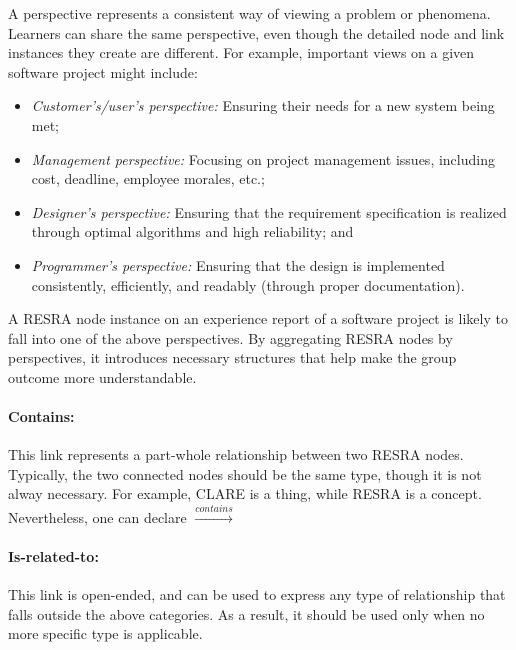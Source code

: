 A perspective represents a consistent way of viewing a problem or
phenomena. Learners can share the same perspective, even though the
detailed node and link instances they create are different. For example,
important views on a given software project might include:

\begin{itemize}
\item {\it Customer's/user's perspective:\/} Ensuring their needs for a new
  system being met;
  
\item {\it Management perspective:\/} Focusing on project management
  issues, including cost, deadline, employee morales, etc.;
  
\item {\it Designer's perspective:\/} Ensuring that the requirement
  specification is realized through optimal algorithms and high reliability;
  and
  
\item {\it Programmer's perspective:\/} Ensuring that the design is
  implemented consistently, efficiently, and readably (through proper
  documentation).
\end{itemize}

A RESRA node instance on an experience report of a software project is
likely to fall into one of the above perspectives. By aggregating RESRA
nodes by perspectives, it introduces necessary structures that help make
the group outcome more understandable.


\paragraph{Contains:}

This link represents a part-whole relationship between two RESRA nodes.
Typically, the two connected nodes should be the same type, though it is
not alway necessary. For example, CLARE is a {\sf thing\/}, while {\sf
RESRA\/} is a {\sf concept\/}. Nevertheless, one can declare  \( \stackrel{contains}{\longrightarrow} \) 

\paragraph{Is-related-to:}

This link is open-ended, and can be used to express any type of
relationship that falls outside the above categories. As a result, it
should be used only when no more specific type is applicable.



